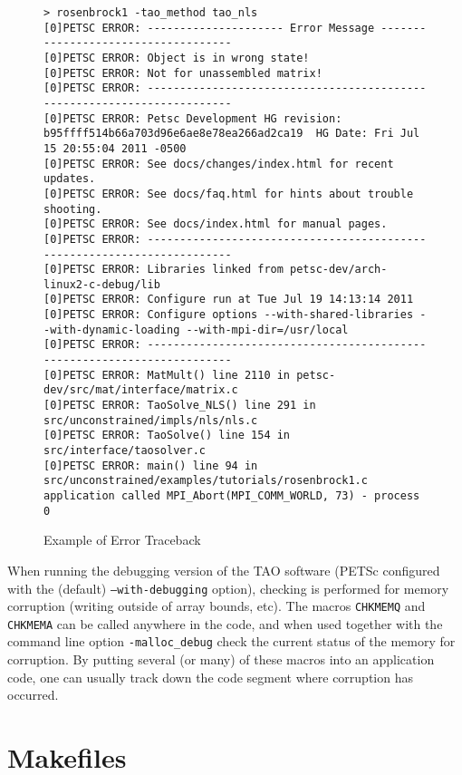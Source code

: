 \begin{figure}[htb]
{\footnotesize
\begin{verbatim}
> rosenbrock1 -tao_method tao_nls
[0]PETSC ERROR: --------------------- Error Message ------------------------------------
[0]PETSC ERROR: Object is in wrong state!
[0]PETSC ERROR: Not for unassembled matrix!
[0]PETSC ERROR: ------------------------------------------------------------------------
[0]PETSC ERROR: Petsc Development HG revision: b95ffff514b66a703d96e6ae8e78ea266ad2ca19  HG Date: Fri Jul 15 20:55:04 2011 -0500
[0]PETSC ERROR: See docs/changes/index.html for recent updates.
[0]PETSC ERROR: See docs/faq.html for hints about trouble shooting.
[0]PETSC ERROR: See docs/index.html for manual pages.
[0]PETSC ERROR: ------------------------------------------------------------------------
[0]PETSC ERROR: Libraries linked from petsc-dev/arch-linux2-c-debug/lib
[0]PETSC ERROR: Configure run at Tue Jul 19 14:13:14 2011
[0]PETSC ERROR: Configure options --with-shared-libraries --with-dynamic-loading --with-mpi-dir=/usr/local
[0]PETSC ERROR: ------------------------------------------------------------------------
[0]PETSC ERROR: MatMult() line 2110 in petsc-dev/src/mat/interface/matrix.c
[0]PETSC ERROR: TaoSolve_NLS() line 291 in src/unconstrained/impls/nls/nls.c
[0]PETSC ERROR: TaoSolve() line 154 in src/interface/taosolver.c
[0]PETSC ERROR: main() line 94 in src/unconstrained/examples/tutorials/rosenbrock1.c
application called MPI_Abort(MPI_COMM_WORLD, 73) - process 0
\end{verbatim}
}
\caption{Example of Error Traceback}
\label{fig:traceback}
\end{figure}

\noindent
When running the debugging version of the TAO software (PETSc configured 
with the (default) \texttt{--with-debugging} option), checking is performed for 
memory corruption
(writing outside of array bounds, etc). The macros \texttt{CHKMEMQ} and
\texttt{CHKMEMA} can be called anywhere in the code, and when used together 
with the command line option \texttt{-malloc\_debug} check the current
status of the memory for corruption.  By putting several (or many) of
these macros into an application code, one can usually track
down the code segment where corruption has occurred.

\section{Makefiles}
\label{sec:makefiles}

